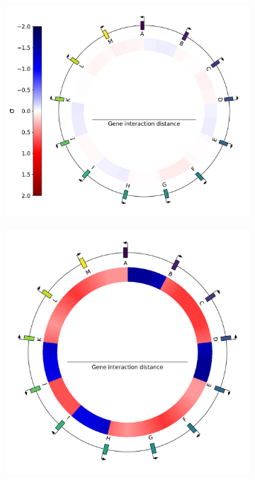 \begin{figure}[H]
\centering
\begin{subfigure}[t]{0.28\textwidth}
\includegraphics[width=\textwidth]{alife/img/13genes_genome_3.pdf}
\label{subfig:alife:genome_3}
\end{subfigure}
\hspace{-3mm}
\begin{subfigure}[t]{0.24\textwidth}
\includegraphics[width=\textwidth]{alife/img/13genes_genome_2.pdf}

\end{subfigure}
\end{figure}
